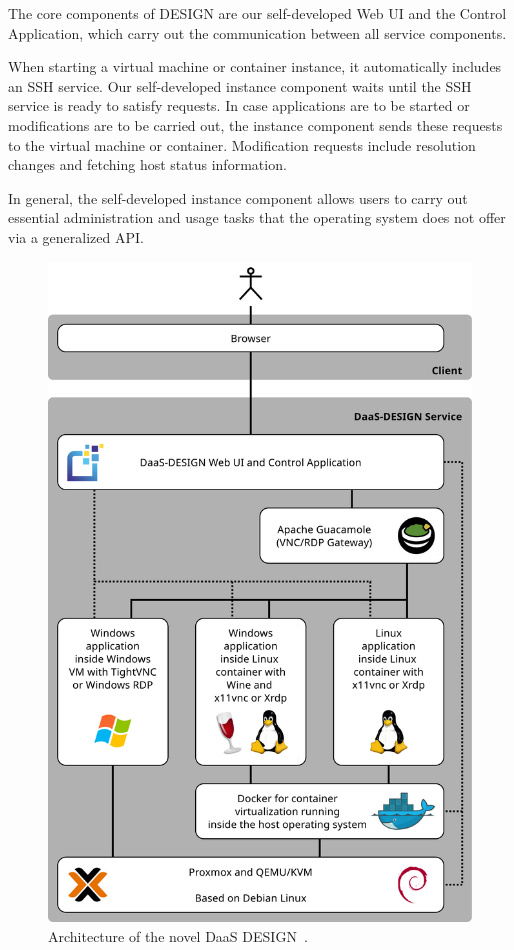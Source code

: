 \documentclass[runningheads]{llncs}
\begin{document}
The core components of DESIGN are our self-developed Web UI and the Control Application, which carry out the communication between all service components. 

When starting a virtual machine or container instance, it automatically includes an SSH service. Our self-developed instance component waits until the SSH service is ready to satisfy requests. In case applications are to be started or modifications are to be carried out, the instance component sends these requests to the virtual machine or container. Modification requests include resolution changes and fetching host status information.

In general, the self-developed instance component allows users to carry out essential administration and usage tasks that the operating system does not offer via a generalized API.



\begin{figure}
\centering
\includegraphics[width=.9\textwidth]{images/DaaS_DESIGN_Architecture_v11_english.pdf}
\caption{Architecture of the novel DaaS DESIGN~\cite{OJCC_2023v8i1n01_Baun}.} \label{figure_architecture}
\end{figure}
\end{document}
